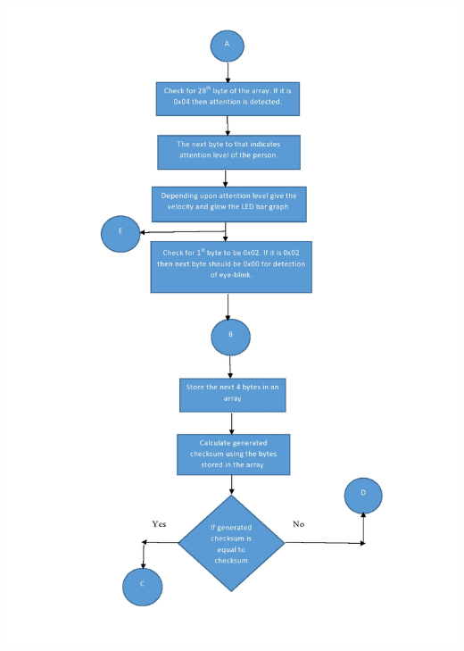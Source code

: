 \documentclass[14pt]{article}
\begin{document}
\begin{center}
	\graphicspath{ {images/} }
	\includegraphics[width=18cm, height=24cm]{Flowchart2}
\end{center}
\end{document}
